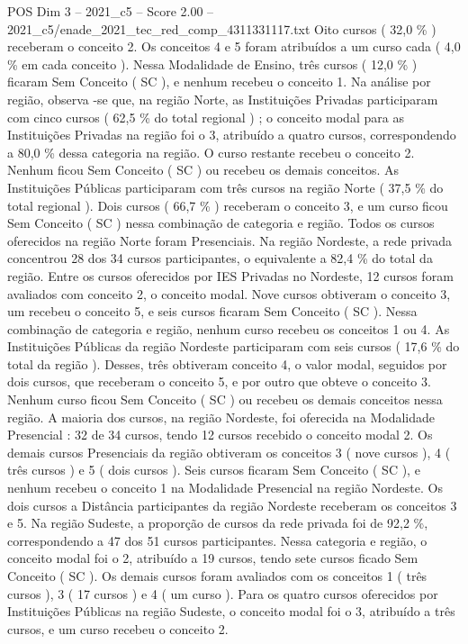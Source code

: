 \begin{textsample}{POS Dim 3 – 2021\_c5 – Score 2.00 – 2021\_c5/enade\_2021\_tec\_red\_comp\_4311331117.txt}
Oito cursos ( 32,0 \% ) receberam o conceito 2.
Os conceitos 4 e 5 foram atribuídos a um curso cada ( 4,0 \% em cada conceito ).
Nessa Modalidade de Ensino, três cursos ( 12,0 \% ) ficaram Sem Conceito ( SC ), e nenhum recebeu o conceito 1.
Na análise por região, observa -se que, na região Norte, as Instituições Privadas participaram com cinco cursos ( 62,5 \% do total regional ) ; o conceito modal para as Instituições Privadas na região foi o 3, atribuído a quatro cursos, correspondendo a 80,0 \% dessa categoria na região.
O curso restante recebeu o conceito 2.
Nenhum ficou Sem Conceito ( SC ) ou recebeu os demais conceitos.
As Instituições Públicas participaram com três cursos na região Norte ( 37,5 \% do total regional ).
Dois cursos ( 66,7 \% ) receberam o conceito 3, e um curso ficou Sem Conceito ( SC ) nessa combinação de categoria e região.
Todos os cursos oferecidos na região Norte foram Presenciais.
Na região Nordeste, a rede privada concentrou 28 dos 34 cursos participantes, o equivalente a 82,4 \% do total da região.
Entre os cursos oferecidos por IES Privadas no Nordeste, 12 cursos foram avaliados com conceito 2, o conceito modal.
Nove cursos obtiveram o conceito 3, um recebeu o conceito 5, e seis cursos ficaram Sem Conceito ( SC ).
Nessa combinação de categoria e região, nenhum curso recebeu os conceitos 1 ou 4.
As Instituições Públicas da região Nordeste participaram com seis cursos ( 17,6 \% do total da região ).
Desses, três obtiveram conceito 4, o valor modal, seguidos por dois cursos, que receberam o conceito 5, e por outro que obteve o conceito 3.
Nenhum curso ficou Sem Conceito ( SC ) ou recebeu os demais conceitos nessa região.
A maioria dos cursos, na região Nordeste, foi oferecida na Modalidade Presencial : 32 de 34 cursos, tendo 12 cursos recebido o conceito modal 2.
Os demais cursos Presenciais da região obtiveram os conceitos 3 ( nove cursos ), 4 ( três cursos ) e 5 ( dois cursos ).
Seis cursos ficaram Sem Conceito ( SC ), e nenhum recebeu o conceito 1 na Modalidade Presencial na região Nordeste.
Os dois cursos a Distância participantes da região Nordeste receberam os conceitos 3 e 5.
Na região Sudeste, a proporção de cursos da rede privada foi de 92,2 \%, correspondendo a 47 dos 51 cursos participantes.
Nessa categoria e região, o conceito modal foi o 2, atribuído a 19 cursos, tendo sete cursos ficado Sem Conceito ( SC ).
Os demais cursos foram avaliados com os conceitos 1 ( três cursos ), 3 ( 17 cursos ) e 4 ( um curso ).
Para os quatro cursos oferecidos por Instituições Públicas na região Sudeste, o conceito modal foi o 3, atribuído a três cursos, e um curso recebeu o conceito 2.

\end{textsample}
